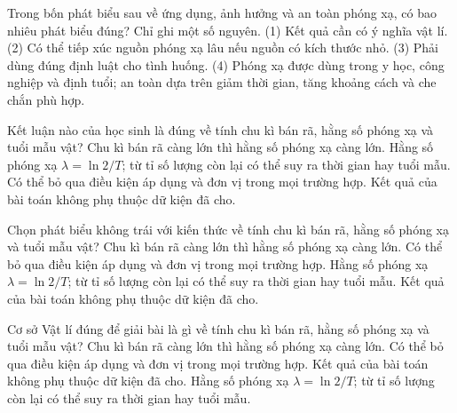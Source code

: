 \begin{ex}
Trong bốn phát biểu sau về ứng dụng, ảnh hưởng và an toàn phóng xạ, có bao nhiêu phát biểu đúng? Chỉ ghi một số nguyên. (1) Kết quả cần có ý nghĩa vật lí. (2) Có thể tiếp xúc nguồn phóng xạ lâu nếu nguồn có kích thước nhỏ. (3) Phải dùng đúng định luật cho tình huống. (4) Phóng xạ được dùng trong y học, công nghiệp và định tuổi; an toàn dựa trên giảm thời gian, tăng khoảng cách và che chắn phù hợp.
\end{ex}

\begin{ex}
Kết luận nào của học sinh là đúng về tính chu kì bán rã, hằng số phóng xạ và tuổi mẫu vật?
\choice
{Chu kì bán rã càng lớn thì hằng số phóng xạ càng lớn.}
{\True Hằng số phóng xạ $\lambda=\ln2/T$; từ tỉ số lượng còn lại có thể suy ra thời gian hay tuổi mẫu.}
{Có thể bỏ qua điều kiện áp dụng và đơn vị trong mọi trường hợp.}
{Kết quả của bài toán không phụ thuộc dữ kiện đã cho.}
\end{ex}

\begin{ex}
Chọn phát biểu không trái với kiến thức về tính chu kì bán rã, hằng số phóng xạ và tuổi mẫu vật?
\choice
{Chu kì bán rã càng lớn thì hằng số phóng xạ càng lớn.}
{Có thể bỏ qua điều kiện áp dụng và đơn vị trong mọi trường hợp.}
{\True Hằng số phóng xạ $\lambda=\ln2/T$; từ tỉ số lượng còn lại có thể suy ra thời gian hay tuổi mẫu.}
{Kết quả của bài toán không phụ thuộc dữ kiện đã cho.}
\end{ex}

\begin{ex}
Cơ sở Vật lí đúng để giải bài là gì về tính chu kì bán rã, hằng số phóng xạ và tuổi mẫu vật?
\choice
{Chu kì bán rã càng lớn thì hằng số phóng xạ càng lớn.}
{Có thể bỏ qua điều kiện áp dụng và đơn vị trong mọi trường hợp.}
{Kết quả của bài toán không phụ thuộc dữ kiện đã cho.}
{\True Hằng số phóng xạ $\lambda=\ln2/T$; từ tỉ số lượng còn lại có thể suy ra thời gian hay tuổi mẫu.}
\end{ex}

